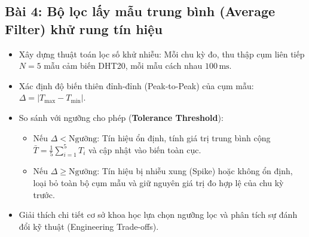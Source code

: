 \newpage
\subsection{Bài 4: Bộ lọc lấy mẫu trung bình (Average Filter) khử rung tín hiệu}

\begin{tcolorbox}[
    enhanced, colback=black!2, colframe=black!60, boxrule=1pt, arc=2.5mm, drop shadow,
    attach boxed title to top left={xshift=4mm, yshift=-3mm},
    boxed title style={enhanced, colback=black!85, colframe=black!85, boxrule=1pt, arc=2.5mm, drop shadow, left=6pt, right=6pt, top=2pt, bottom=2pt},
    title=\textcolor{white}{\large\textbf{Yêu cầu đề bài (Trích phiếu bài tập)}}
]
\bfseries
\vspace{0.2cm}
\begin{itemize}
    \item Xây dựng thuật toán lọc số khử nhiễu: Mỗi chu kỳ đo, thu thập cụm liên tiếp $N = 5$ mẫu cảm biến DHT20, mỗi mẫu cách nhau $100\,\text{ms}$.
    \item Xác định độ biến thiên đỉnh-đỉnh (Peak-to-Peak) của cụm mẫu: $\Delta = |T_{\max} - T_{\min}|$.
    \item So sánh với ngưỡng cho phép (\textbf{Tolerance Threshold}):
    \begin{itemize}
        \item Nếu $\Delta < \text{Ngưỡng}$: Tín hiệu ổn định, tính giá trị trung bình cộng $\bar{T} = \frac{1}{5}\sum_{i=1}^{5} T_i$ và cập nhật vào biến toàn cục.
        \item Nếu $\Delta \ge \text{Ngưỡng}$: Tín hiệu bị nhiễu xung (Spike) hoặc không ổn định, loại bỏ toàn bộ cụm mẫu và giữ nguyên giá trị đo hợp lệ của chu kỳ trước.
    \end{itemize}
    \item Giải thích chi tiết cơ sở khoa học lựa chọn ngưỡng lọc và phân tích sự đánh đổi kỹ thuật (Engineering Trade-offs).
\end{itemize}
\end{tcolorbox}

\vspace{0.2cm}
